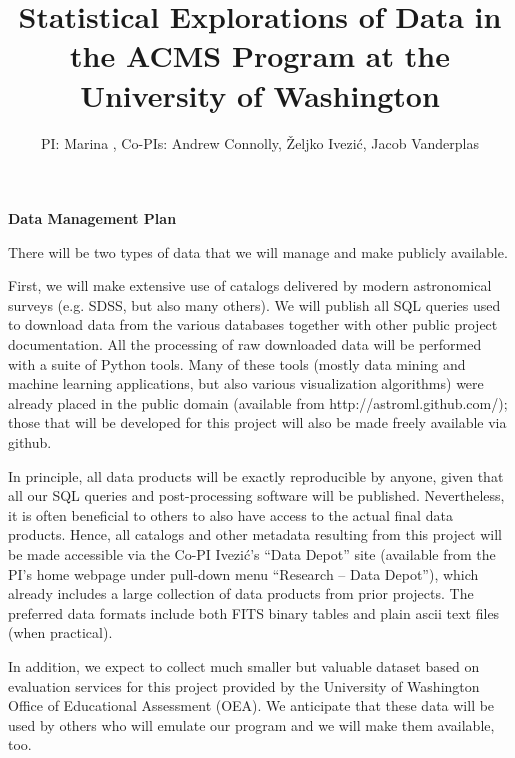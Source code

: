 \documentclass[nofootbib,floatfix,11pt]{article}
\title{Statistical Explorations of Data in the {ACMS} {Program} at the {University} of {Washington}}
\author{PI: Marina \meila, Co-PIs: Andrew Connolly, \v{Z}eljko Ivezi\'{c}, Jacob Vanderplas}
\begin{document}
\centerline{\large \bf Data Management Plan}

There will be two types of data that we will manage and make publicly available.

First, we will make extensive use of catalogs delivered by modern astronomical
surveys (e.g. SDSS, but also many others). We will publish all SQL queries used to 
download data from the various databases together with other public project documentation.
All the processing of raw downloaded data will be performed with a suite of Python
tools. Many of these tools (mostly data mining and machine learning applications,
but also various visualization algorithms) were already placed in the public domain 
(available from http://astroml.github.com/); those that will be developed for
this project will also be made freely available via github. 

In principle, all data products will be exactly reproducible by anyone, given that all
our SQL queries and post-processing software will be published. Nevertheless, it is 
often beneficial to others to also have access to the actual final data products. Hence,
all catalogs and other metadata resulting from this project will be made accessible via 
the Co-PI Ivezi\'{c}'s ``Data Depot'' site (available from the PI's home webpage under 
pull-down menu ``Research -- Data Depot''),  which already includes a large collection 
of data products from prior projects. The preferred data formats include both FITS binary 
tables and plain ascii text files (when practical). 

In addition, we expect to collect much smaller but valuable dataset based on evaluation 
services for this project provided by the University of Washington Office of Educational 
Assessment (OEA). We anticipate that these data will be used by others who will emulate
our program and we will make them available, too.
\end{document}
